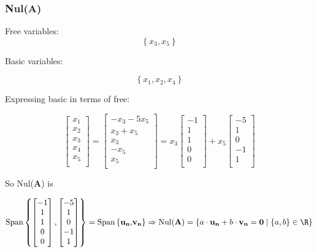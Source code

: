 \documentclass{article}
\begin{document}
\subsubsection{Nul(\textbf{A})} 
Free variables:
\[%
    \left\{ x_3,x_5 \right\}
\]%

Basic variables:

\[%
    \left\{ x_1,x_2,x_4 \right\}
\]%

Expressing basic in terms of free:

\[%
    \begin{bmatrix} 
        x_1 \\
		x_2 \\
		x_3 \\
		x_4 \\
		x_5 \\		
    \end{bmatrix}
    =
    \begin{bmatrix} 
        -x_3 -5 x_5 \\
		x_3+x_5 \\
		x_3 \\
		-x_5 \\
		x_5 \\		
    \end{bmatrix}
    =
    x_3
    \begin{bmatrix} 
        -1 \\
		1 \\
		1 \\
		0 \\
		0 \\		
    \end{bmatrix}
    +
    x_5
    \begin{bmatrix} 
        -5 \\
		1 \\
		0 \\
		-1 \\
		1 \\		
    \end{bmatrix}
\]%

So Nul($ \mathbf{A} $) is

\[%
    \text{Span} \left\{  
    \begin{bmatrix} 
        -1 \\
		1 \\
		1 \\
		0 \\
		0 \\		
    \end{bmatrix}
    ,
    \begin{bmatrix} 
        -5 \\
		1 \\
		0 \\
		-1 \\
		1 \\		
    \end{bmatrix}
    \right\}
    =
    \text{Span} \left\{ \mathbf{u_{n},} \mathbf{v_n}  \right\}
    \Rightarrow 
    \text{Nul}(\mathbf{A})
    =
    \left\{ 
    a \cdot\mathbf{u_{n}} + b \cdot \mathbf{v_n} = \mathbf{0}  \mid \left\{ a,b \right\}
    \in \R
    \right\}
\]%
\end{document}
